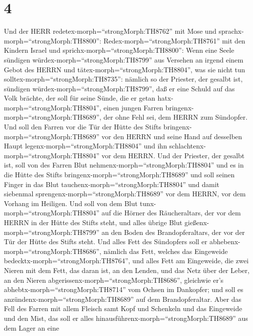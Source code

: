 \hypertarget{section-3}{%
\section{4}\label{section-3}}

 Und der HERR redetex-morph=``strongMorph:TH8762'' mit Mose
und sprachx-morph=``strongMorph:TH8800'': 
Redex-morph=``strongMorph:TH8761'' mit den Kindern Israel und
sprichx-morph=``strongMorph:TH8800'': Wenn eine Seele sündigen
würdex-morph=``strongMorph:TH8799'' aus Versehen an irgend einem Gebot
des HERRN und tätex-morph=``strongMorph:TH8804'', was sie nicht tun
solltex-morph=``strongMorph:TH8735'':  nämlich so der
Priester, der gesalbt ist, sündigen würdex-morph=``strongMorph:TH8799'',
daß er eine Schuld auf das Volk brächte, der soll für seine Sünde, die
er getan hatx-morph=``strongMorph:TH8804'', einen jungen Farren
bringenx-morph=``strongMorph:TH8689'', der ohne Fehl sei, dem HERRN zum
Sündopfer.  Und soll den Farren vor die Tür der Hütte des
Stifts bringenx-morph=``strongMorph:TH8689'' vor den HERRN und seine
Hand auf desselben Haupt legenx-morph=``strongMorph:TH8804'' und ihn
schlachtenx-morph=``strongMorph:TH8804'' vor dem HERRN.  Und
der Priester, der gesalbt ist, soll von des Farren Blut
nehmenx-morph=``strongMorph:TH8804'' und es in die Hütte des Stifts
bringenx-morph=``strongMorph:TH8689''  und soll seinen
Finger in das Blut tauchenx-morph=``strongMorph:TH8804'' und damit
siebenmal sprengenx-morph=``strongMorph:TH8689'' vor dem HERRN, vor dem
Vorhang im Heiligen.  Und soll von dem Blut
tunx-morph=``strongMorph:TH8804'' auf die Hörner des Räucheraltars, der
vor dem HERRN in der Hütte des Stifts steht, und alles übrige Blut
gießenx-morph=``strongMorph:TH8799'' an den Boden des Brandopferaltars,
der vor der Tür der Hütte des Stifts steht.  Und alles Fett
des Sündopfers soll er abhebenx-morph=``strongMorph:TH8686'', nämlich
das Fett, welches das Eingeweide bedecktx-morph=``strongMorph:TH8764'',
und alles Fett am Eingeweide,  die zwei Nieren mit dem Fett,
das daran ist, an den Lenden, und das Netz über der Leber, an den Nieren
abgerissenx-morph=``strongMorph:TH8686'',  gleichwie er's
abhebtx-morph=``strongMorph:TH8714'' vom Ochsen im Dankopfer; und soll
es anzündenx-morph=``strongMorph:TH8689'' auf dem Brandopferaltar.
 Aber das Fell des Farren mit allem Fleisch samt Kopf und
Schenkeln und das Eingeweide und den Mist,  das soll er
alles hinausführenx-morph=``strongMorph:TH8689'' aus dem Lager an eine

